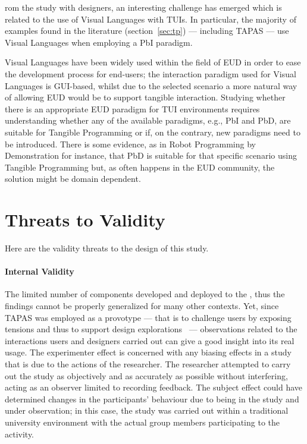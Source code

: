 rom the study with designers, an interesting challenge has emerged which is related to the use of Visual Languages with \acp{TUI}. In particular, the majority of examples found in the literature (section~\ref{sec:tp}) --- including \ac{TAPAS} --- use Visual Languages when employing a \ac{PbI} paradigm. 

Visual Languages have been widely used within the field of \ac{EUD} in order to ease the development process for end-users; the interaction paradigm used for Visual Languages is \ac{GUI}-based, whilst due to the selected scenario a more natural way of allowing \ac{EUD} would be to support tangible interaction. Studying whether there is an appropriate \ac{EUD} paradigm for \ac{TUI} environments requires understanding whether any of the available paradigms, e.g., \ac{PbI} and \ac{PbD}, are suitable for Tangible Programming or if, on the contrary, new paradigms need to be introduced. There is some evidence, as in Robot Programming by Demonstration for instance, that \ac{PbD} is suitable for that specific scenario using Tangible Programming but, as often happens in the \ac{EUD} community, the solution might be domain dependent.


\section{Threats to Validity}
Here are the validity threats to the design of this study.

\paragraph{Internal Validity} The limited number of components developed and deployed to the , thus the findings cannot be properly generalized for many other contexts. Yet, since \acs{TAPAS} was employed as a provotype --- that is to challenge users by exposing tensions and thus to support design explorations~\cite{Boer:2012ku} --- observations related to the interactions users and designers carried out can give a good insight into its real usage. The experimenter effect is concerned with any biasing effects in a study that is due to the actions of the researcher. The researcher attempted to carry out the study as objectively and as accurately as possible without interfering, acting as an observer limited to recording feedback. The subject effect could have determined changes in the participants' behaviour due to being in the study and under observation; in this case, the study was carried out within a traditional university environment with the actual group members participating to the activity.

